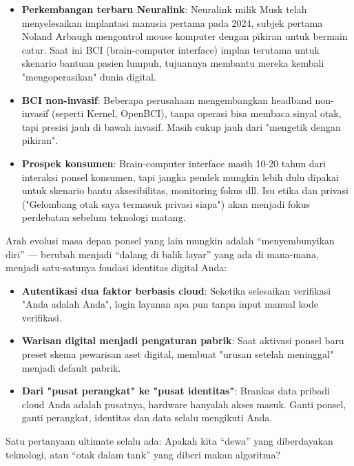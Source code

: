 \begin{itemize}
  \item \textbf{Perkembangan terbaru Neuralink}: Neuralink milik Musk telah menyelesaikan implantasi manusia pertama pada 2024, subjek pertama Noland Arbaugh mengontrol mouse komputer dengan pikiran untuk bermain catur. Saat ini BCI (brain-computer interface) implan terutama untuk skenario bantuan pasien lumpuh, tujuannya membantu mereka kembali "mengoperasikan" dunia digital.
  \item \textbf{BCI non-invasif}: Beberapa perusahaan mengembangkan headband non-invasif (seperti Kernel, OpenBCI), tanpa operasi bisa membaca sinyal otak, tapi presisi jauh di bawah invasif. Masih cukup jauh dari "mengetik dengan pikiran".
  \item \textbf{Prospek konsumen}: Brain-computer interface masih 10-20 tahun dari interaksi ponsel konsumen, tapi jangka pendek mungkin lebih dulu dipakai untuk skenario bantu aksesibilitas, monitoring fokus dll. Isu etika dan privasi ("Gelombang otak saya termasuk privasi siapa") akan menjadi fokus perdebatan sebelum teknologi matang.
\end{itemize}


Arah evolusi masa depan ponsel yang lain mungkin adalah “menyembunyikan diri” — berubah menjadi “dalang di balik layar” yang ada di mana-mana, menjadi satu-satunya fondasi identitas digital Anda:

\begin{itemize}
  \item \textbf{Autentikasi dua faktor berbasis cloud}: Seketika selesaikan verifikasi "Anda adalah Anda", login layanan apa pun tanpa input manual kode verifikasi.
  \item \textbf{Warisan digital menjadi pengaturan pabrik}: Saat aktivasi ponsel baru preset skema pewarisan aset digital, membuat "urusan setelah meninggal" menjadi default pabrik.
  \item \textbf{Dari "pusat perangkat" ke "pusat identitas"}: Brankas data pribadi cloud Anda adalah pusatnya, hardware hanyalah akses masuk. Ganti ponsel, ganti perangkat, identitas dan data selalu mengikuti Anda.
\end{itemize}


Satu pertanyaan ultimate selalu ada: Apakah kita “dewa” yang diberdayakan teknologi, atau “otak dalam tank” yang diberi makan algoritma?

